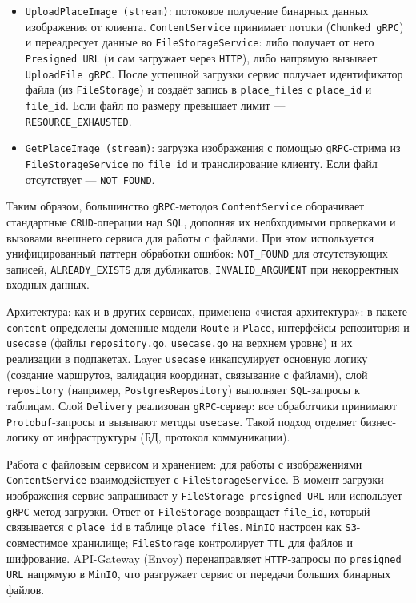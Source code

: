 \begin{itemize}
    \item \texttt{UploadPlaceImage (stream)}: потоковое получение бинарных данных изображения от клиента. \texttt{ContentService} принимает потоки (\texttt{Chunked gRPC}) и переадресует данные во \texttt{FileStorageService}: либо получает от него \texttt{Presigned URL} (и сам загружает через \texttt{HTTP}), либо напрямую вызывает \texttt{UploadFile gRPC}. После успешной загрузки сервис получает идентификатор файла (из \texttt{FileStorage}) и создаёт запись в \texttt{place\_files} с \texttt{place\_id} и \texttt{file\_id}. Если файл по размеру превышает лимит — \\ \texttt{RESOURCE\_EXHAUSTED}.
    \item \texttt{GetPlaceImage (stream)}: загрузка изображения с помощью \texttt{gRPC}-стрима из \texttt{FileStorageService} по \texttt{file\_id} и транслирование клиенту. Если файл отсутствует — \texttt{NOT\_FOUND}.
\end{itemize}
\noindent Таким образом, большинство \texttt{gRPC}-методов \texttt{ContentService} оборачивает стандартные \texttt{CRUD}-операции над \texttt{SQL}, дополняя их необходимыми проверками и вызовами внешнего сервиса для работы с файлами. При этом используется унифицированный паттерн обработки ошибок: \texttt{NOT\_FOUND} для отсутствующих записей, \texttt{ALREADY\_EXISTS} для дубликатов, \texttt{INVALID\_ARGUMENT} при некорректных входных данных.

Архитектура: как и в других сервисах, применена «чистая архитектура»: в пакете \texttt{content} определены доменные модели \texttt{Route} и \texttt{Place}, интерфейсы репозитория и \texttt{usecase} (файлы \texttt{repository.go}, \texttt{usecase.go} на верхнем уровне) и их реализации в подпакетах. Layer \texttt{usecase} инкапсулирует основную логику (создание маршрутов, валидация координат, связывание с файлами), слой \texttt{repository} (например, \texttt{PostgresRepository}) выполняет \texttt{SQL}-запросы к таблицам. Слой \texttt{Delivery} реализован \texttt{gRPC}-сервер: все обработчики принимают \texttt{Protobuf}-запросы и вызывают методы \texttt{usecase}. Такой подход отделяет бизнес-логику от инфраструктуры (БД, протокол коммуникации).

Работа с файловым сервисом и хранением: для работы с изображениями \texttt{ContentService} взаимодействует с \texttt{FileStorageService}. В момент загрузки изображения сервис запрашивает у \texttt{FileStorage presigned URL} или использует \texttt{gRPC}-метод загрузки. Ответ от \texttt{FileStorage} возвращает \texttt{file\_id}, который связывается с \texttt{place\_id} в таблице \texttt{place\_files}. \texttt{MinIO} настроен как \texttt{S3}-совместимое хранилище; \texttt{FileStorage} контролирует \texttt{TTL} для файлов и шифрование. API-Gateway (Envoy) перенаправляет \texttt{HTTP}-запросы по \texttt{presigned URL} напрямую в \texttt{MinIO}, что разгружает сервис от передачи больших бинарных файлов.

